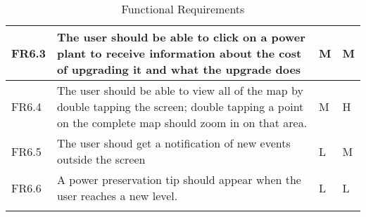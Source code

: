 \begin{longtable}{| p{1.5cm} | p{8cm} | p{1.5cm} | p{2cm} |}
      FR6.3 & The user should be able to click on a power plant to receive information about the cost 
      of upgrading it and what the upgrade does & M & M \\ \hline

      FR6.4 & The user should be able to view all of the map by double tapping the screen; double tapping a 
      point on the complete map should zoom in on that area. & M & H \\ \hline

      FR6.5 & The user shoud get a notification of new events outside the screen & L & M \\ \hline

      FR6.6 & A power preservation tip should appear when the user reaches a new level. & L & L \\ \hline

   \hline
   \caption{Functional Requirements}
\end{longtable}
